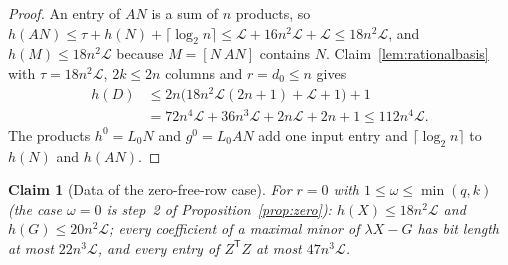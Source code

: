 \documentclass[journal]{IEEEtran}
\theoremstyle{plainn}
\newtheorem{claim}{Claim}
\theoremstyle{remark}
\begin{document}
\begin{proof}
An entry of $AN$ is a sum of $n$ products, so
$h(AN)\le\tau+h(N)+\lceil\log_2 n\rceil\le\mathcal L+16n^2\mathcal L+\mathcal L\le18n^2\mathcal L$,
and $h(M)\le18n^2\mathcal L$ because $M=[N\ AN]$ contains $N$. Claim~\ref{lem:rationalbasis} with
$\tau=18n^2\mathcal L$, $2k\le2n$ columns and $r=d_0\le n$ gives
\begin{equation*}
\begin{aligned}
h(D)&\le2n\bigl(18n^2\mathcal L(2n+1)+\mathcal L+1\bigr)+1\\
&=72n^4\mathcal L+36n^3\mathcal L+2n\mathcal L+2n+1\le112n^4\mathcal L .
\end{aligned}
\end{equation*}
The products $h^0=L_0N$ and $g^0=L_0AN$ add one input entry and $\lceil\log_2 n\rceil$ to $h(N)$ and
$h(AN)$.
\end{proof}

\begin{claim}[Data of the zero-free-row case]\label{app:zero}
For $r=0$ with $1\le\omega\le\min(q,k)$ (the case $\omega=0$ is step~2 of
Proposition~\ref{prop:zero}): $h(X)\le18n^2\mathcal L$ and $h(G)\le20n^2\mathcal L$; every coefficient of
a maximal minor of $\lambda X-G$ has bit length at most $22n^3\mathcal L$, and every entry of
$Z^{\mathsf T}Z$ at most $47n^3\mathcal L$.
\end{claim}
\end{document}
